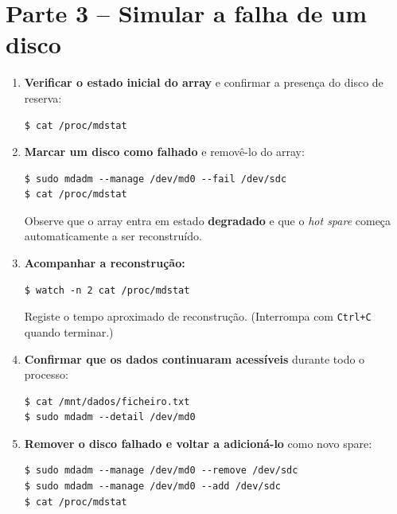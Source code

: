 \documentclass[11pt,a4paper]{article}
\begin{document}
\section{Parte 3 -- Simular a falha de um disco}
\begin{enumerate}[label=\arabic*.,resume]

    \item \textbf{Verificar o estado inicial do array} e confirmar a presença do disco de reserva:
\begin{lstlisting}
$ cat /proc/mdstat
\end{lstlisting}

    \item \textbf{Marcar um disco como falhado} e removê-lo do array:
\begin{lstlisting}
$ sudo mdadm --manage /dev/md0 --fail /dev/sdc
$ cat /proc/mdstat
\end{lstlisting}
    Observe que o array entra em estado \textbf{degradado} e que o \emph{hot spare} começa automaticamente a ser reconstruído.

    \item \textbf{Acompanhar a reconstrução:}
\begin{lstlisting}
$ watch -n 2 cat /proc/mdstat
\end{lstlisting}
    Registe o tempo aproximado de reconstrução. (Interrompa com \texttt{Ctrl+C} quando terminar.)

    \item \textbf{Confirmar que os dados continuaram acessíveis} durante todo o processo:
\begin{lstlisting}
$ cat /mnt/dados/ficheiro.txt
$ sudo mdadm --detail /dev/md0
\end{lstlisting}

    \item \textbf{Remover o disco falhado e voltar a adicioná-lo} como novo spare:
\begin{lstlisting}
$ sudo mdadm --manage /dev/md0 --remove /dev/sdc
$ sudo mdadm --manage /dev/md0 --add /dev/sdc
$ cat /proc/mdstat
\end{lstlisting}

\end{enumerate}
\end{document}
